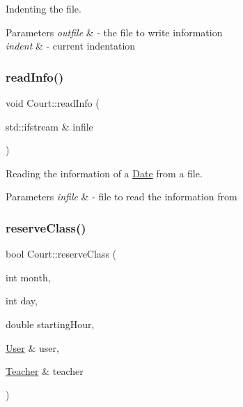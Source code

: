 Indenting the file. 


\begin{DoxyParams}{Parameters}
{\em outfile} & -\/ the file to write information \\
\hline
{\em indent} & -\/ current indentation \\
\hline
\end{DoxyParams}
\mbox{\label{class_court_a2d801d3edd9d0280ef0420b131e07f2e}} 
\subsubsection{\texorpdfstring{read\+Info()}{readInfo()}}
{\footnotesize\ttfamily void Court\+::read\+Info (\begin{DoxyParamCaption}\item[{std\+::ifstream \&}]{infile }\end{DoxyParamCaption})}



Reading the information of a \mbox{\hyperlink{class_date}{Date}} from a file. 


\begin{DoxyParams}{Parameters}
{\em infile} & -\/ file to read the information from \\
\hline
\end{DoxyParams}
\mbox{\label{class_court_afaab22238eff25ec1031017d57a1c008}} 
\subsubsection{\texorpdfstring{reserve\+Class()}{reserveClass()}}
{\footnotesize\ttfamily bool Court\+::reserve\+Class (\begin{DoxyParamCaption}\item[{int}]{month,  }\item[{int}]{day,  }\item[{double}]{starting\+Hour,  }\item[{\mbox{\hyperlink{class_user}{User}} \&}]{user,  }\item[{\mbox{\hyperlink{class_teacher}{Teacher}} \&}]{teacher }\end{DoxyParamCaption})}



